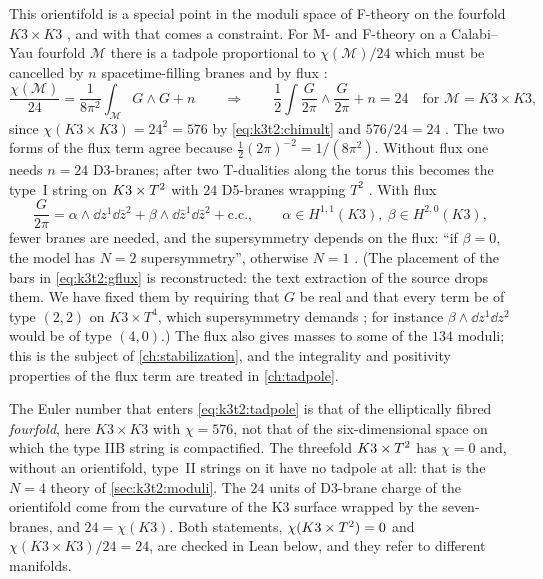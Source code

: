 This orientifold is a special point in the moduli space of F-theory on the fourfold
$K3\times K3$ , and with that comes a constraint. For
M- and F-theory on a Calabi--Yau fourfold $\mathcal M$ there is a tadpole
proportional to $\chi(\mathcal M)/24$ which must be cancelled by $n$ spacetime-filling branes
and by flux :
\begin{equation}\label{eq:k3t2:tadpole}
 \frac{\chi(\mathcal M)}{24}=\frac1{8\pi^2}\int_{\mathcal M}G\wedge G+n
 \qquad\Longrightarrow\qquad
 \frac12\int\frac G{2\pi}\wedge\frac G{2\pi}+n=24\quad\text{for }\mathcal M=K3\times K3,
\end{equation}
since $\chi(K3\times K3)=24^2=576$ by \eqref{eq:k3t2:chimult} and $576/24=24$
. The two forms of the flux term agree
because $\tfrac12(2\pi)^{-2}=1/(8\pi^2)$. Without flux one needs $n=24$ D3-branes; after two
T-dualities along the torus this becomes the type~I string on $K3\times T^2$ with $24$ D5-branes
wrapping $T^2$ . With flux
\begin{equation}\label{eq:k3t2:gflux}
 \frac G{2\pi}=\alpha\wedge\dd z^1\dd\bar z^2+\beta\wedge\dd\bar z^1\dd\bar z^2
 +\text{c.c.},\qquad
 \alpha\in H^{1,1}(K3),\ \beta\in H^{2,0}(K3),
\end{equation}
fewer branes are needed, and the supersymmetry depends on the flux: ``if $\beta=0$, the model
has $N=2$ supersymmetry'', otherwise $N=1$ .
(The placement of the bars in \eqref{eq:k3t2:gflux} is reconstructed: the text extraction of
the source drops them. We have fixed them by requiring that $G$ be real and that every term
be of type $(2,2)$ on $K3\times T^4$, which supersymmetry demands
; for instance $\beta\wedge\dd z^1\dd z^2$ would be of type
$(4,0)$.) The flux also gives
masses to some of the $134$ moduli; this is the subject of
\cref{ch:stabilization}, and the integrality and positivity properties of the flux term are
treated in \cref{ch:tadpole}.

\begin{pitfallbox}[Common pitfall: ``$\chi(\KT)=0$, so there is no tadpole'']
The Euler number that enters \eqref{eq:k3t2:tadpole} is that of the elliptically fibred
\emph{fourfold}, here $K3\times K3$ with $\chi=576$, not that of the six-dimensional space
on which the type IIB string is compactified. The threefold $K3\times T^2$ has $\chi=0$ and, without
an orientifold, type~II strings on it have no tadpole at all: that is the $N=4$ theory of
\cref{sec:k3t2:moduli}. The $24$ units of D3-brane charge of the orientifold come from the
curvature of the K3 surface wrapped by the seven-branes, and $24=\chi(K3)$. Both statements,
$\chi(\KT)=0$ and $\chi(K3\times K3)/24=24$, are checked in Lean below, and they refer to
different manifolds.
\end{pitfallbox}


